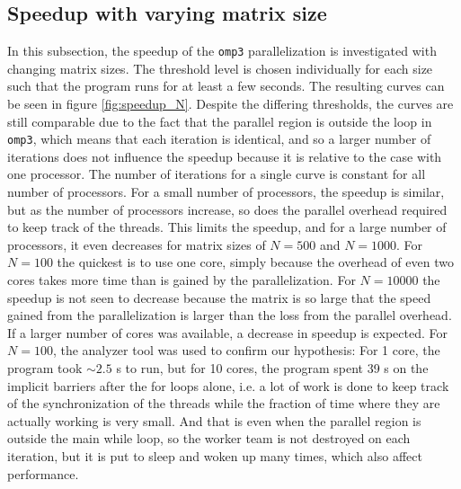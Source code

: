 \subsection{Speedup with varying matrix size}
In this subsection, the speedup of the \texttt{omp3} parallelization is investigated with changing matrix sizes. The threshold level is chosen individually for each size such that the program runs for at least a few seconds. The resulting curves can be seen in figure \ref{fig:speedup_N}. Despite the differing thresholds, the curves are still comparable due to the fact that the parallel region is outside the loop in \texttt{omp3}, which means that each iteration is identical, and so a larger number of iterations does not influence the speedup because it is relative to the case with one processor. The number of iterations for a single curve is constant for all number of processors. For a small number of processors, the speedup is similar, but as the number of processors increase, so does the parallel overhead required to keep track of the threads. This limits the speedup, and for a large number of processors, it even decreases for matrix sizes of $N = 500$ and $N = 1000$. For $N = 100$ the quickest is to use one core, simply because the overhead of even two cores takes more time than is gained by the parallelization. For $N = 10000$ the speedup is not seen to decrease because the matrix is so large that the speed gained from the parallelization is larger than the loss from the parallel overhead. If a larger number of cores was available, a decrease in speedup is expected. For $N = 100$, the analyzer tool was used to confirm our hypothesis: For 1 core, the program took $\sim 2.5$ s to run, but for 10 cores, the program spent 39 s on the implicit barriers after the for loops alone, i.e. a lot of work is done to keep track of the synchronization of the threads while the fraction of time where they are actually working is very small. And that is even when the parallel region is outside the main while loop, so the worker team is not destroyed on each iteration, but it is put to sleep and woken up many times, which also affect performance.

